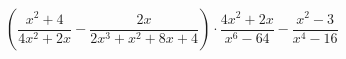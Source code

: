 \begin{ex}[type=expression]
	\begin{condition}
		\(\left( \dfrac{x^2+4}{4x^2+2x}-\dfrac{2x}{2x^3+x^2+8x+4} \right)\cdot\dfrac{4x^2+2x}{x^6-64}-\dfrac{x^2-3}{x^4-16}\)
	\end{condition}
\end{ex}